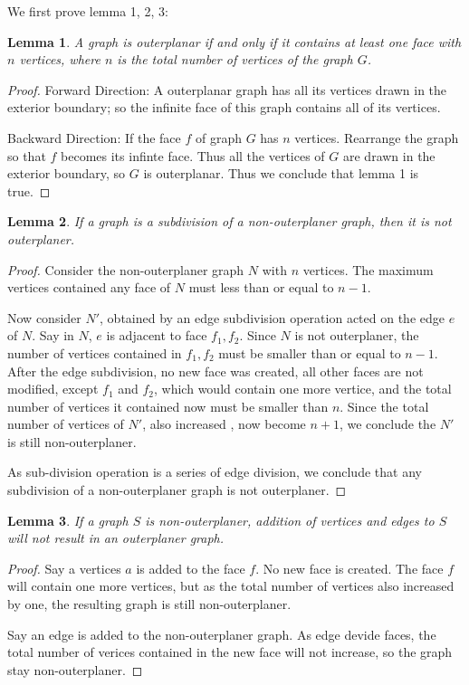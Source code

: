 \documentclass{article}
\newtheorem{lemma}{Lemma}
\begin{document}
We first prove lemma 1, 2, 3:
\begin{lemma}
	A graph is outerplanar if and only if it contains at least one face with $n$ vertices, where $n$ is the total number of vertices of the graph $G$.
\end{lemma}

\begin{proof}
Forward Direction:
A outerplanar graph has all its vertices drawn in the exterior boundary; so the infinite face of this graph contains all of its vertices.

Backward Direction:
If the face $f$ of graph $G$ has $n$ vertices. Rearrange the graph so that $f$ becomes its infinte face. Thus all the vertices of $G$ are drawn in the exterior boundary, so $G$ is outerplanar.
Thus we conclude that lemma 1 is true. 
\end{proof}

\begin{lemma}
	If a graph is a subdivision of a non-outerplaner graph, then it is not outerplaner.
\end{lemma}

\begin{proof}
Consider the non-outerplaner graph $N$ with $n$ vertices. The maximum vertices contained any face of $N$ must less than or equal to $n-1$.

Now consider $N'$, obtained by an edge subdivision operation acted on the edge $e$ of $N$. 
Say in $N$, $e$ is adjacent to face $f_1, f_2$. 
Since $N$ is not outerplaner, the number of vertices contained in $f_1, f_2$ must be smaller than or equal to $n-1$. 
After the edge subdivision, no new face was created, all other faces are not modified, except $f_1$ and $f_2$, which would contain one more vertice, and the total number of vertices it contained now must be smaller than $n$.
Since the total number of vertices of $N'$, also increased , now become $n+1$, we conclude the $N'$ is still non-outerplaner.

As sub-division operation is a series of edge division, we conclude that any subdivision of a non-outerplaner graph is not outerplaner.
\end{proof}

\begin{lemma}
	If a graph $S$ is non-outerplaner, addition of vertices and edges to $S$ will not result in an outerplaner graph.
\end{lemma}

\begin{proof}
Say a vertices $a$ is added to the face $f$. No new face is created. The face $f$ will contain one more vertices, but as the total number of vertices also increased by one, the resulting graph is still non-outerplaner.

Say an edge is added to the non-outerplaner graph. As edge devide faces, the total number of verices contained in the new face will not increase, so the graph stay non-outerplaner.
\end{proof}
\end{document}
